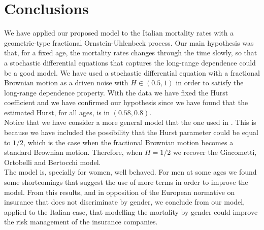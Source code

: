 \documentclass[smallextended]{svjour3}
\begin{document}
\section{Conclusions}\label{sec:Conclutions}

We have applied our proposed model to the Italian mortality rates with a
geometric-type fractional Ornstein-Uhlenbeck process. Our
main hypothesis was that, for a fixed age, the mortality rates changes through
the time slowly, so that a stochastic differential equations
that captures the long-range dependence could be a good model. We have used a
stochastic differential equation with a fractional Brownian motion as a driven
noise with $H\in (0.5,1)$ in order to satisfy the long-range dependence
property. With the data we have fixed the Hurst coefficient and we have
confirmed our hypothesis since
we have found that the estimated Hurst, for all ages, is in $(0.58,0.8)$.  \\



Notice that we have consider a more general model that the one used in
\cite{gi-or-be}. This is because we have included the possibility that the
Hurst parameter could be equal to $1/2$, which is the case when the fractional
Brownian motion becomes a standard Brownian motion. Therefore,
when $H=1/2$ we recover the  Giacometti, Ortobelli and Bertocchi model.\\







The model is, specially for women, well behaved. For men at some ages we found
some shortcomings that suggest the use of more terms in order to improve the model. 
From this results, and in opposition of the European normative on insurance that does not discriminate by gender, we conclude from our model, applied to the Italian case, that modelling the mortality by gender could improve the risk management of the insurance companies.\\
\end{document}
